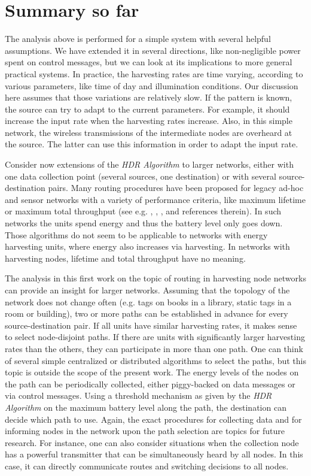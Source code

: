 \documentclass[12 pt]{article}
\newcommand{\debug}[1]{\mbox{\tt #1}}
\renewcommand{\debug}[1]{}              \newcommand{\cmd}[1]{}
\newcommand{\msec}[2]{\renewcommand{\sname}{}\section[#1
	\debug{\fbox {#2}}]{#1 \cmd{msec} \dlabelx{#2}}\markboth{\today}{Sec. \thesection}}
\begin{document}
\msec{Summary so far}{Implications}

The analysis above is performed for a simple system with several helpful assumptions.  We have extended it in several directions, like non-negligible power spent on control messages, but we can look at its implications to more general practical systems.  In practice, the harvesting rates are time varying, according to various parameters, like time of day and illumination conditions.  Our discussion here assumes that those variations are relatively slow. If the pattern is known, the source can try to adapt to the current parameters.  For example, it should increase the input rate  when the harvesting rates increase.  Also, in this simple network, the wireless transmissions of the intermediate nodes are overheard at the source.  The latter can use this information in order to adapt the input rate.

Consider now extensions of the \emph{HDR Algorithm} to larger networks, either with one data collection point (several sources, one destination) or with several source-destination pairs.  Many routing procedures have been proposed for legacy ad-hoc and sensor networks with a variety of performance criteria, like maximum lifetime or maximum total throughput (see e.g. , , ,  and references therein).  In such networks the units spend energy and thus the battery level only goes down.  Those algorithms do not seem to be applicable to networks with energy harvesting units, where energy also increases via harvesting.  In networks with harvesting nodes, lifetime and total throughput have no meaning.

The analysis in this first work on the topic of routing in harvesting node networks can provide an insight for larger networks.  Assuming that the topology of the network does not change often (e.g. tags on books in a library, static tags in a room or building), two or more paths can be established in advance for every source-destination pair.  If all units have similar harvesting rates, it makes sense to select node-disjoint paths.  If there are units with significantly larger harvesting rates than the others, they can participate in more than one path.  One can think of several simple centralized or distributed algorithms to select the paths, but this topic is outside the scope of the present work.  The energy levels of the nodes on the path can be periodically collected, either piggy-backed on data messages or via control messages.   Using a threshold mechanism as given by the \emph{HDR Algorithm} on the maximum battery level along the path, the destination can decide which path to use.  Again, the exact procedures for collecting data and for informing nodes in the network upon the path selection are topics for future research.  For instance, one can also consider situations when the collection node has a powerful transmitter that can be simultaneously heard by all nodes.  In this case, it can directly communicate routes and switching decisions to all nodes.
\end{document}
